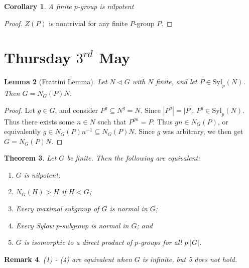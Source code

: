 \documentclass[a4paper,10pt]{article}
\newtheorem{thm}{Theorem}
\newtheorem{Cor}[thm]{Corollary}
\newtheorem{Lem}[thm]{Lemma}
\newtheorem{rem}[thm]{Remark}
\begin{document}
\begin{Cor}
A finite $p$-group is nilpotent
\end{Cor}
\begin{proof}
$Z(P)$ is nontrivial for any finite $P$-group $P$. 
\end{proof}







\newpage
\section{Thursday $3^{rd}$ May}

\begin{Lem}[Frattini Lemma]
Let $ N \triangleleft G$ with $N$ finite, and let $P \in \text{Syl}_p(N)$. Then $G = N_G(P) N$.
\end{Lem}
\begin{proof}
Let $g \in G$, and consider $P^g \subseteq N^g = N$. Since $|P^g| = |P|$, $P^g \in \text{Syl}_p(N)$. Thus there exists some $n \in N$ such that $P^{gn} = P$.  Thus $gn \in N_G(P)$, or equivalently $g \in N_G(P) n^{-1} \subseteq N_G(P)N$. Since $g$ was arbitrary, we then get $G =  N_G(P)N$.
\end{proof}


\begin{thm}
Let $G$ be finite. Then the following are equivalent:

\begin{enumerate}
\item $G$ is nilpotent;
\item $N_G(H) > H$ if $H < G$; 
\item Every maximal subgroup of $G$ is normal in $G$;
\item Every Sylow $p$-subgroup is normal in $G$; and
\item $G$ is isomorphic to a direct product of $p$-groups for all $p \big| |G|$.
\end{enumerate}

\end{thm}

\begin{rem}
(1) - (4) are equivalent when $G$ is infinite, but 5 does not hold. 
\end{rem}
\end{document}
